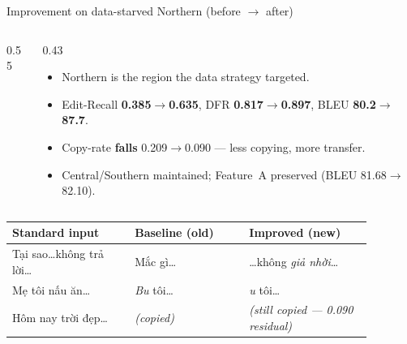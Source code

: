 \documentclass[aspectratio=169,11pt]{beamer}
\newcommand{\hl}[1]{\textcolor{oiblue}{\textbf{#1}}}
\begin{document}
\begin{frame}{Improvement on data-starved Northern (before $\to$ after)}
  \begin{columns}[T]
    \begin{column}{0.55\textwidth}
      \centering
    \end{column}
    \begin{column}{0.43\textwidth}
      \begin{itemize}\small
        \item Northern is the region the data strategy targeted.
        \item Edit-Recall \hl{0.385$\to$0.635}, DFR \hl{0.817$\to$0.897}, BLEU \hl{80.2$\to$87.7}.
        \item Copy-rate \hl{falls} 0.209$\to$0.090 --- less copying, more transfer.
        \item Central/Southern maintained; Feature~A preserved (BLEU 81.68$\to$82.10).
      \end{itemize}
    \end{column}
  \end{columns}
  \vspace{0.2em}
  \centering\scriptsize
  \begin{tabular}{p{0.30\linewidth} p{0.28\linewidth} p{0.30\linewidth}}
    \toprule
    \textbf{Standard input} & \textbf{Baseline (old)} & \textbf{Improved (new)}\\
    \midrule
    Tại sao\dots không trả lời\dots & Mắc gì\dots & \dots không \emph{\textcolor{oiblue}{giả nhời}}\dots\\
    Mẹ tôi nấu ăn\dots & \emph{Bu} tôi\dots & \emph{\textcolor{oiblue}{u}} tôi\dots\\
    Hôm nay trời đẹp\dots & \emph{(copied)} & \emph{(still copied --- 0.090 residual)}\\
    \bottomrule
  \end{tabular}
\end{frame}
\end{document}

